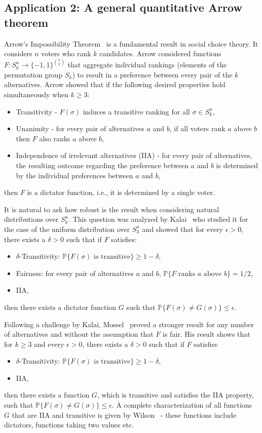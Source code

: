 \documentclass[11pt]{amsart}
\newcommand{\PP}{\mathbb{P}}
\newcommand{\eps}{\epsilon}
\newcommand{\1}{\mathbf{1}}
\theoremstyle{definition}
\theoremstyle{plain}
\theoremstyle{remark}
\numberwithin{equation}{section}
\begin{document}
\subsection{Application 2: A general quantitative Arrow theorem}
Arrow's Impossibility Theorem~\cite{Arrow:50,Arrow:63} is a fundamental result in  social choice theory. 
It considers $n$ voters who rank $k$ candidates. 
Arrow considered functions $F : S_k^n \to \{-1,1\}^{k \choose 2}$ that aggregate individual rankings (elements of the permutation group $S_k$) to result in a preference between every pair of the $k$ alternatives.
Arrow showed that if the following desired properties hold simultaneously when $k \geq 3$:
\begin{itemize}
\item Transitivity - $F(\sigma)$ induces a transitive ranking for all $\sigma \in S_k^n$,
\item Unanimity  - for every pair of alternatives $a$ and $b$, if all voters rank $a$ above $b$ then $F$
also ranks $a$ above $b$,
\item Independence of irrelevant alternatives (IIA) - for every pair of alternatives, the resulting outcome regarding the preference between $a$ and $b$ is determined by the individual preferences between $a$ and $b$,
\end{itemize}
then $F$ is a dictator function, i.e., it is determined by a single voter.

It is natural to ask how robust is the result when considering natural distributions over $S_k^n$.
This question was analyzed by Kalai~\cite{Kalai:02} who studied it for the case of the uniform distribution over $S_3^n$ and showed that for every $\eps > 0$, there exists a $\delta > 0$ such that if $F$ satisfies:
\begin{itemize}
\item $\delta$-Transitivity: $\PP\{F(\sigma) \mbox{ is transitive}\} \geq 1-\delta$,
\item Fairness:   for every pair of alternatives $a$ and $b$, $\PP \{F \mbox{ ranks $a$ above $b$}\} = 1/2$,
\item IIA,
\end{itemize}
then there exists a dictator function $G$ such that $\PP\{F(\sigma) \neq G(\sigma)\}\leq \eps$.

Following a challenge by Kalai, Mossel~\cite{Mossel11} proved a stronger result for any number of alternatives and without the assumption that $F$ is fair.  His result shows that for $k \geq 3$ and every $\eps > 0$, there exists a $\delta > 0$ such that if $F$ satisfies
\begin{itemize}
\item $\delta$-Transitivity:  $\PP \{F(\sigma) \mbox{ is transitive}\}\geq 1-\delta$,
\item IIA,
\end{itemize}
then there exists a function $G$, which is transitive and satisfies the IIA property, such that $\PP\{F(\sigma) \neq G(\sigma)\}\leq \eps$. A complete characterization of all functions $G$ that are IIA and transitive is given by Wilson~\cite{Wilson:72} - these functions include dictators, functions taking two values etc.
\end{document}
